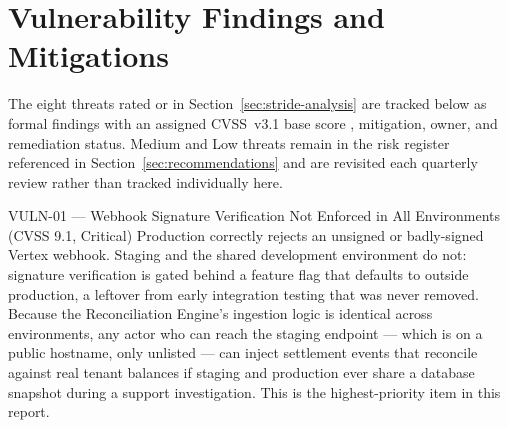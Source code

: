 \section{Vulnerability Findings and Mitigations}
\label{sec:findings}

The eight threats rated \critical{} or \highrisk{} in Section~\ref{sec:stride-analysis} are tracked below as formal findings with an assigned CVSS~v3.1 base score \cite{cvss31}, mitigation, owner, and remediation status. Medium and Low threats remain in the risk register referenced in Section~\ref{sec:recommendations} and are revisited each quarterly review rather than tracked individually here.

\begin{warningbox}{VULN-01 --- Webhook Signature Verification Not Enforced in All Environments (CVSS 9.1, Critical)}
Production correctly rejects an unsigned or badly-signed Vertex webhook. Staging and the shared development environment do not: signature verification is gated behind a feature flag that defaults to  outside production, a leftover from early integration testing that was never removed. Because the Reconciliation Engine's ingestion logic is identical across environments, any actor who can reach the staging endpoint --- which is on a public hostname, only unlisted --- can inject settlement events that reconcile against real tenant balances if staging and production ever share a database snapshot during a support investigation. This is the highest-priority item in this report.
\end{warningbox}

